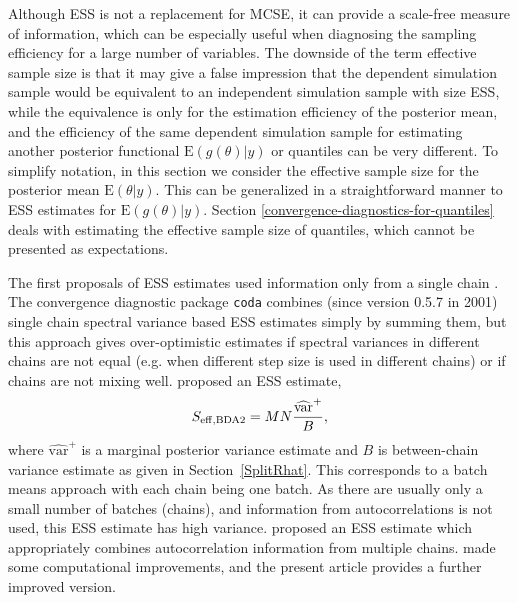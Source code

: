 \documentclass[american,]{article}
\theoremstyle{definition}
\begin{document}
Although ESS is not a replacement for MCSE, it can provide a scale-free
measure of information, which can be
especially useful when diagnosing the sampling efficiency for a large
number of variables. The downside of the term effective sample size is
that it may give a false
impression that the dependent simulation sample would be equivalent to
an independent simulation sample with size ESS, while the equivalence
is only for the estimation efficiency of the posterior mean, and the efficiency of the same
dependent simulation sample for estimating another posterior functional
\(\mbox{E}\left(g(\theta) | y\right)\) or quantiles can be very
different.
%
To simplify notation, in this section we consider the effective sample
size for the posterior mean \(\mbox{E}\left(\theta | y\right)\). This can be 
generalized in a straightforward manner to ESS estimates for \(\mbox{E}\left(g(\theta) | y\right)\).
Section \ref{convergence-diagnostics-for-quantiles} deals with
estimating the effective sample size of quantiles, which cannot be
presented as expectations.

The first proposals of ESS estimates  used information only from
a single chain \citep[see, e.g.][]{Sorensen+etal:1995}. The convergence
diagnostic package \texttt{coda} \citep{coda2006} combines (since
version 0.5.7 in 2001) single chain spectral variance based ESS
estimates simply by summing them, but this approach gives
over-optimistic estimates if spectral variances in different chains
are not equal (e.g. when different step size is used in different
chains) or if chains are not mixing well.  \citet{BDA2} proposed an
ESS estimate,
\begin{equation}
S_{\rm eff,BDA2} = MN\frac{\widehat{\mbox{var}}^{+}}{B},
\end{equation}
where $\widehat{\mbox{var}}^+$ is a marginal posterior variance
estimate and $B$ is between-chain variance estimate as given in
Section~\ref{SplitRhat}.  This corresponds to a batch means approach
with each chain being one batch. As there are usually only a small
number of batches (chains), and information from autocorrelations is
not used, this ESS estimate has high variance.
%
\citet{BDA3} proposed an ESS estimate which appropriately combines
autocorrelation information from multiple chains. \citet{StanManual.2.18.0} made some computational
improvements, and the present article provides a further improved version.

\end{document}
